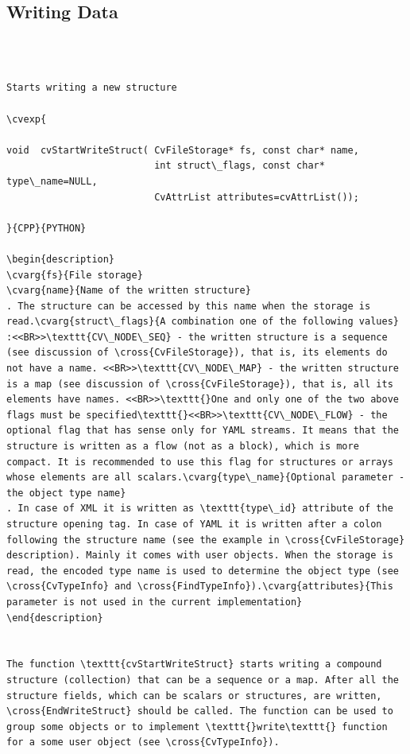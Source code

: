 \subsection{Writing Data}
\begin{verbatim}


\end{verbatim}
\label{StartWriteStruct}
\begin{verbatim}

Starts writing a new structure

\cvexp{

void  cvStartWriteStruct( CvFileStorage* fs, const char* name,
                          int struct\_flags, const char* type\_name=NULL,
                          CvAttrList attributes=cvAttrList());

}{CPP}{PYTHON}

\begin{description}
\cvarg{fs}{File storage}
\cvarg{name}{Name of the written structure}
. The structure can be accessed by this name when the storage is read.\cvarg{struct\_flags}{A combination one of the following values}
:<<BR>>\texttt{CV\_NODE\_SEQ} - the written structure is a sequence (see discussion of \cross{CvFileStorage}), that is, its elements do not have a name. <<BR>>\texttt{CV\_NODE\_MAP} - the written structure is a map (see discussion of \cross{CvFileStorage}), that is, all its elements have names. <<BR>>\texttt{}One and only one of the two above flags must be specified\texttt{}<<BR>>\texttt{CV\_NODE\_FLOW} - the optional flag that has sense only for YAML streams. It means that the structure is written as a flow (not as a block), which is more compact. It is recommended to use this flag for structures or arrays whose elements are all scalars.\cvarg{type\_name}{Optional parameter - the object type name}
. In case of XML it is written as \texttt{type\_id} attribute of the structure opening tag. In case of YAML it is written after a colon following the structure name (see the example in \cross{CvFileStorage} description). Mainly it comes with user objects. When the storage is read, the encoded type name is used to determine the object type (see \cross{CvTypeInfo} and \cross{FindTypeInfo}).\cvarg{attributes}{This parameter is not used in the current implementation}
\end{description}


The function \texttt{cvStartWriteStruct} starts writing a compound structure (collection) that can be a sequence or a map. After all the structure fields, which can be scalars or structures, are written, \cross{EndWriteStruct} should be called. The function can be used to group some objects or to implement \texttt{}write\texttt{} function for a some user object (see \cross{CvTypeInfo}).


\end{verbatim}
